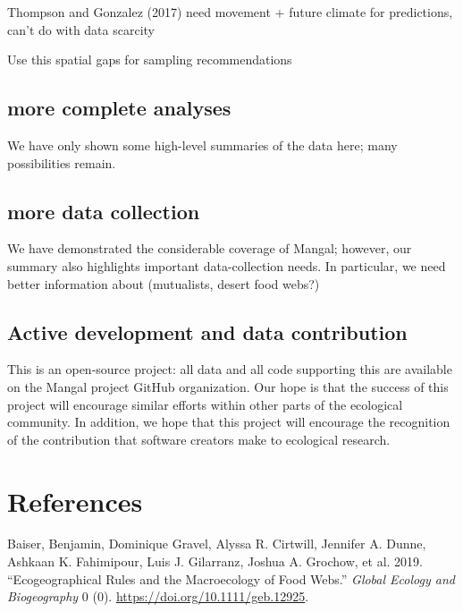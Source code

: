 Thompson and Gonzalez (2017) need movement + future climate for
predictions, can't do with data scarcity

Use this spatial gaps for sampling recommendations

\hypertarget{more-complete-analyses}{%
\subsection{more complete analyses}\label{more-complete-analyses}}

We have only shown some high-level summaries of the data here; many
possibilities remain.

\hypertarget{more-data-collection}{%
\subsection{more data collection}\label{more-data-collection}}

We have demonstrated the considerable coverage of Mangal; however, our
summary also highlights important data-collection needs. In particular,
we need better information about (mutualists, desert food webs?)

\hypertarget{active-development-and-data-contribution}{%
\subsection{Active development and data
contribution}\label{active-development-and-data-contribution}}

This is an open-source project: all data and all code supporting this
are available on the Mangal project GitHub organization. Our hope is
that the success of this project will encourage similar efforts within
other parts of the ecological community. In addition, we hope that this
project will encourage the recognition of the contribution that software
creators make to ecological research.

\hypertarget{references}{%
\section*{References}\label{references}}

\hypertarget{refs}{}
\leavevmode\hypertarget{ref-BaisGrav19}{}%
Baiser, Benjamin, Dominique Gravel, Alyssa R. Cirtwill, Jennifer A.
Dunne, Ashkaan K. Fahimipour, Luis J. Gilarranz, Joshua A. Grochow, et
al. 2019. ``Ecogeographical Rules and the Macroecology of Food Webs.''
\emph{Global Ecology and Biogeography} 0 (0).
\url{https://doi.org/10.1111/geb.12925}.


